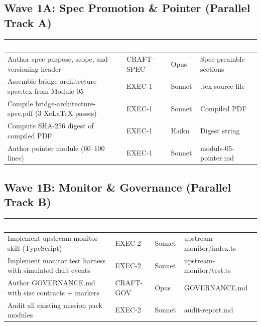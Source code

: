 \documentclass[11pt,letterpaper]{article}
\newcommand{\tableheader}[1]{\textbf{\sffamily\textcolor{white}{#1}}}
\begin{document}
\subsection{Wave 1A: Spec Promotion \& Pointer (Parallel Track A)}

\begin{center}
\begin{tabularx}{\textwidth}{L{3.5cm}L{2.5cm}L{2cm}X}
\toprule
{}
\tableheader{Task} & \tableheader{Agent} & \tableheader{Model} & \tableheader{Output} \\
\midrule
Author spec purpose, scope, and versioning header & CRAFT-SPEC & Opus & Spec preamble sections \\
Assemble bridge-architecture-spec.tex from Module 05 & EXEC-1 & Sonnet & .tex source file \\
Compile bridge-architecture-spec.pdf (3 XeLaTeX passes) & EXEC-1 & Sonnet & Compiled PDF \\
Compute SHA-256 digest of compiled PDF & EXEC-1 & Haiku & Digest string \\
Author pointer module (60--100 lines) & EXEC-1 & Sonnet & module-05-pointer.md \\
\bottomrule
\end{tabularx}
\end{center}

\subsection{Wave 1B: Monitor \& Governance (Parallel Track B)}

\begin{center}
\begin{tabularx}{\textwidth}{L{3.5cm}L{2.5cm}L{2cm}X}
\toprule
{}
\tableheader{Task} & \tableheader{Agent} & \tableheader{Model} & \tableheader{Output} \\
\midrule
Implement upstream monitor skill (TypeScript) & EXEC-2 & Sonnet & upstream-monitor/index.ts \\
Implement monitor test harness with simulated drift events & EXEC-2 & Sonnet & upstream-monitor/test.ts \\
Author GOVERNANCE.md with size contracts + markers & CRAFT-GOV & Opus & GOVERNANCE.md \\
Audit all existing mission pack modules & EXEC-2 & Sonnet & audit-report.md \\
\bottomrule
\end{tabularx}
\end{center}
\end{document}
